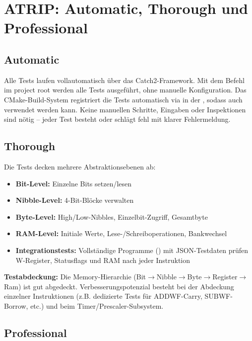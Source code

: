 \section{ATRIP: Automatic, Thorough und Professional}

\subsection{Automatic}

Alle Tests laufen vollautomatisch über das Catch2-Framework. Mit dem Befehl  im project root werden alle Tests ausgeführt, ohne manuelle Konfiguration. Das CMake-Build-System registriert die Tests automatisch via  in der , sodass auch  verwendet werden kann. Keine manuellen Schritte, Eingaben oder Inspektionen sind nötig -- jeder Test besteht oder schlägt fehl mit klarer Fehlermeldung.

\subsection{Thorough}

Die Tests decken mehrere Abstraktionsebenen ab:

\begin{itemize}
    \item \textbf{Bit-Level:} Einzelne Bits setzen/lesen
    \item \textbf{Nibble-Level:} 4-Bit-Blöcke verwalten
    \item \textbf{Byte-Level:} High/Low-Nibbles, Einzelbit-Zugriff, Gesamtbyte
    \item \textbf{RAM-Level:} Initiale Werte, Lese-/Schreiboperationen, Bankwechsel
    \item \textbf{Integrationstests:} Vollständige Programme () mit JSON-Testdaten prüfen W-Register, Statusflags und RAM nach jeder Instruktion
\end{itemize}

\textbf{Testabdeckung:} Die Memory-Hierarchie (Bit$\rightarrow$Nibble$\rightarrow$Byte$\rightarrow$Register$\rightarrow$Ram) ist gut abgedeckt. Verbesserungspotenzial besteht bei der Abdeckung einzelner Instruktionen (z.B. dedizierte Tests für ADDWF-Carry, SUBWF-Borrow, etc.) und beim Timer/Prescaler-Subsystem.

\subsection{Professional}

